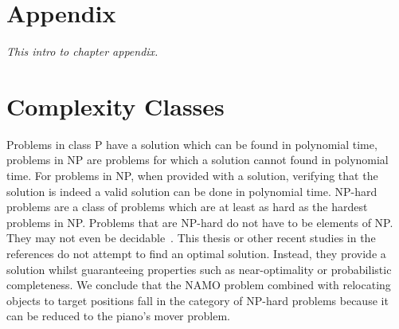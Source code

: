 \chapter{Appendix}%
\label{chap:appendix}

\appendix

\textit{This intro to chapter appendix.\bs}

%

\chapter{Complexity Classes}%
\label{paragraph:complexity_classes}
Problems in class P have a solution which can be found in polynomial time, problems in \ac{NP} are problems for which a solution cannot found in polynomial time. For problems in \ac{NP}, when provided with a solution, verifying that the solution is indeed a valid solution can be done in polynomial time. \ac{NP-hard} problems are a class of problems which are at least as hard as the hardest problems in \ac{NP}. Problems that are \ac{NP-hard} do not have to be elements of NP. They may not even be decidable~\cite{pokharel_computational_2020}. This thesis or other recent studies in the references do not attempt to find an optimal solution. Instead, they provide a solution whilst guaranteeing properties such as near-optimality or probabilistic completeness. We conclude that the \ac{NAMO} problem combined with relocating objects to target positions fall in the category of \ac{NP-hard} problems because it can be reduced to the piano's mover problem.\bs

